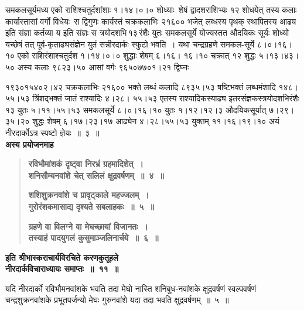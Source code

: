 \documentclass[11pt, openany]{book}
\begin{document}
\begin{sloppypar}
समकलसूर्यमध्य एको राशिश्चतुर्दशांशाः १।१४।०।० शोध्याः~शेषं द्वादशराशिभ्यः १२ शोधयेत् तस्य कलाः कार्यास्तासां वर्गो विधेयः~स द्विगुणः कार्यस्तं चक्रकलाभिः २१६०० भजेत् लब्धस्य पृथक् स्थापितस्य आढ्य इति संज्ञा कर्तव्या य इति संज्ञः स त्रयोदशभि\textendash \,१३\textendash \,रंशैः युतः समकलसूर्ये योज्यस्तत औदयिकः सूर्यः शोध्यो यच्छेषं तत् पूर्व-कृताढ्यसंज्ञेन युतं सन्नीरदार्कः स्फुटो भवति~। यथा चन्द्रग्रहणे समकल-सूर्ये ८।०।१६।१० एको राशिरंशाश्चतुर्दश १।१४।०।० शुद्धाः शेषम् ६।१६। १६।१० चक्रात् १२ शुद्धः ५।१३।४३।५० अस्य कलाः ९८२३।५० आसां वर्गः ९६५०७७०१।२१ द्विघ्नः 
\end{sloppypar}

\newpage

\begin{sloppypar}
\noindent १९३०१५४०२।४२ चक्रकलाभिः २१६०० भक्ते लब्धं कलादि ८९३५।५३ षष्टिभक्तं लब्धमंशादि १४८।५५।५३ त्रिंशद्भक्तं जातं राश्यादिः ४।२८। ५५।५३ एतस्य राश्यादिकस्याढ्य इतरसंज्ञकस्त्रयोदशभिरंशैः १३ युतः ५।११।५५।५३ समकलसूर्ये ८।०।१६।१० युतः १।१२।१२।३ औदयिकसूर्यात् ७।२९।३५।२० शुद्धः शेषम् ६।१७।२३।१७ आढ्येन ४।२८।५५।५३ युक्तम् ११।१६।१९।१० अयं नीरदार्कोऽत्र स्पष्टो ज्ञेयः~॥~३~॥\\

{\small \textbf{अस्य प्रयोजनमाह\textendash }}

 \label{11.4}
\begin{quote}
{\large \textbf{{\color{purple}रविभौमांशकं दृष्ट्वा निरभ्रं ग्रहमादिशेत्~। \\
शनिसौम्यनवांशे चेत् सलिलं क्षुद्रवर्षणम्~॥~४~॥}}
\vspace{1mm}

 \label{11.5}
\textbf{{\color{purple}शशिशुक्रनवांशे च प्रावृट्काले महज्जलम्~।\\
गुरोरंशकमासाद्य दृश्यते सबलाहकः~॥~५~॥}}
\vspace{1mm}

 \label{11.6}
\textbf{{\color{purple}ग्रहणे वा विलग्ने वा मेघच्छायां विजानतः~।\\ 
तस्याहं पादयुगलं कुसुमाञ्जलिनार्चये~॥~६~॥}}}
\end{quote}

\begin{center}
{\large \textbf{इति श्रीभास्कराचार्यविरचिते करणकुतूहले\\
नीरदार्कविचाराध्यायः समाप्तः~॥~११~॥}}
\end{center}

यदि नीरदार्को रविभौमनवांशके भवति तदा मेघो नास्ति शनिबुध-नवांशके क्षुद्रवर्षणं स्वल्पवर्षणं चन्द्रशुक्रनवांशके प्रभूतपर्जन्यो मेघः गुरुनवांशे यदा तदा भवति क्षुद्रवर्षणम्~॥~५~॥
\end{sloppypar}
\end{document}
